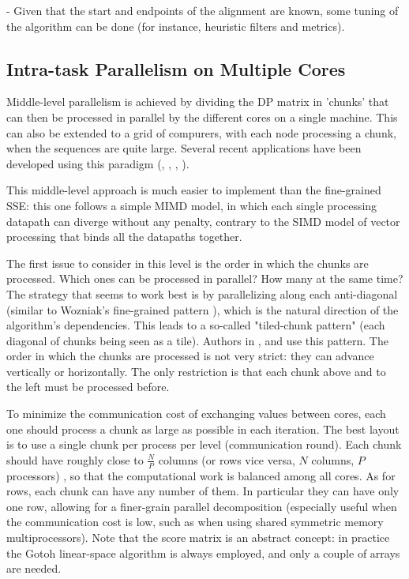 - Given that the start and endpoints of the alignment are known, some tuning of the algorithm can be done (for instance, heuristic filters and metrics).	%
	





\subsection{Intra-task Parallelism on Multiple Cores}

Middle-level parallelism is achieved by dividing the \ac{DP} matrix in 'chunks' that can then be processed in parallel by the different cores on a single machine. This can also be extended to a grid of compurers, with each node processing a chunk, when the sequences are quite large. Several recent applications have been developed using this paradigm (\cite{liao2004parallel}, \cite{meng2005exploiting}, \cite{framework2010parallel}, \cite{hosny}).

This middle-level approach is much easier to implement than the fine-grained SSE: this one follows a simple MIMD model, in which each single processing datapath can diverge without any penalty, contrary to the SIMD model of vector processing that binds all the datapaths together. 

The first issue to consider in this level is the order in which the chunks are processed. Which ones can be processed in parallel? How many at the same time? The strategy that seems to work best is by parallelizing along each anti-diagonal (similar to Wozniak's fine-grained pattern \cite{wozniak}), which is the natural direction of the algorithm's dependencies. This leads to a so-called "tiled-chunk pattern" (each diagonal of chunks being seen as a tile). Authors in \cite{boukerche2007parallel}, \cite{zalign} and \cite{hosny} use this pattern. The order in which the chunks are processed is not very strict: they can advance vertically or horizontally. The only restriction is that each chunk above and to the left must be processed before.

To minimize the communication cost of exchanging values between cores, each one should process a chunk as large as possible in each iteration. The best layout is to use a single chunk per process per level (communication round). Each chunk should have roughly close to $\frac{N}{P}$ columns (or rows vice versa, $N$ columns, $P$ processors) , so that the computational work is balanced among all cores.  As for rows, each chunk can have any number of them. In particular they can have only one row, allowing for a finer-grain parallel decomposition \cite{boukerche2007parallel} (especially useful when the communication cost is low, such as when using shared symmetric memory multiprocessors). Note that the score matrix is an abstract concept: in practice the Gotoh linear-space algorithm is always employed, and only a couple of arrays are needed.

